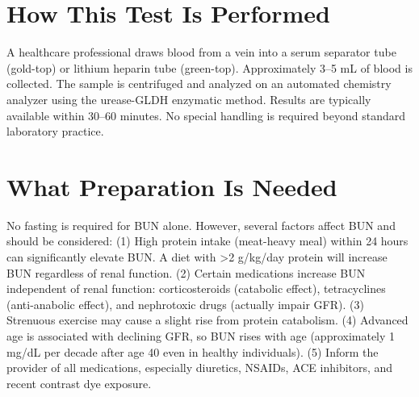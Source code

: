 \section*{How This Test Is Performed}
A healthcare professional draws blood from a vein into a serum separator tube (gold-top) or lithium heparin tube (green-top). Approximately 3--5 mL of blood is collected. The sample is centrifuged and analyzed on an automated chemistry analyzer using the urease-GLDH enzymatic method. Results are typically available within 30--60 minutes. No special handling is required beyond standard laboratory practice.

\section*{What Preparation Is Needed}
No fasting is required for BUN alone. However, several factors affect BUN and should be considered: (1) High protein intake (meat-heavy meal) within 24 hours can significantly elevate BUN. A diet with >2 g/kg/day protein will increase BUN regardless of renal function. (2) Certain medications increase BUN independent of renal function: corticosteroids (catabolic effect), tetracyclines (anti-anabolic effect), and nephrotoxic drugs (actually impair GFR). (3) Strenuous exercise may cause a slight rise from protein catabolism. (4) Advanced age is associated with declining GFR, so BUN rises with age (approximately 1 mg/dL per decade after age 40 even in healthy individuals). (5) Inform the provider of all medications, especially diuretics, NSAIDs, ACE inhibitors, and recent contrast dye exposure.

